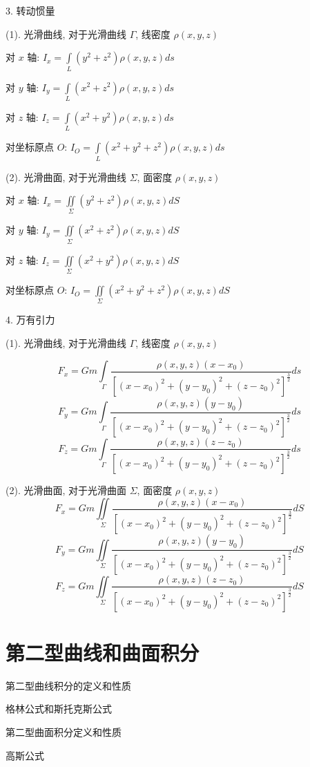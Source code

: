 3. \textcolor{purplea}{转动惯量}
\begin{definition}[转动惯量: $I=mr^2$]
	
	(1). 光滑曲线, 对于光滑曲线 $\Gamma$, 线密度 $\rho(x,y,z)$
	
	对 $x$ 轴: $I_{x}=\int\limits_{L}(y^2+z^2)\rho(x,y,z)ds$
	
	对 $y$ 轴: $I_{y}=\int\limits_{L}(x^2+z^2)\rho(x,y,z)ds$
	
	对 $z$ 轴: $I_{z}=\int\limits_{L}(x^2+y^2)\rho(x,y,z)ds$
	
	对坐标原点 $O$: $I_{O}=\int\limits_{L}(x^2+y^2+z^2)\rho(x,y,z)ds$
	
	(2). 光滑曲面, 对于光滑曲线 $\Sigma$, 面密度 $\rho(x,y,z)$
	
	对 $x$ 轴: $I_{x}=\iint\limits_{\Sigma}(y^2+z^2)\rho(x,y,z)dS$
	
	对 $y$ 轴: $I_{y}=\iint\limits_{\Sigma}(x^2+z^2)\rho(x,y,z)dS$
	
	对 $z$ 轴: $I_{z}=\iint\limits_{\Sigma}(x^2+y^2)\rho(x,y,z)dS$
	
	对坐标原点 $O$: $I_{O}=\iint\limits_{\Sigma}(x^2+y^2+z^2)\rho(x,y,z)dS$
	
\end{definition}

4. \textcolor{purpleb}{万有引力}
\begin{definition}[引力公式: $F=\dfrac{GMm}{r^2}$]	

	(1). 光滑曲线, 对于光滑曲线 $\Gamma$, 线密度 $\rho(x,y,z)$

	$$F_{x}=Gm\int\limits_{\Gamma}\dfrac{\rho(x,y,z)(x-x_{0})}{[(x-x_{0})^2+(y-y_{0})^2+(z-z_{0})^2]^{\frac{3}{2}}}ds$$
	$$F_{y}=Gm\int\limits_{\Gamma}\dfrac{\rho(x,y,z)(y-y_{0})}{[(x-x_{0})^2+(y-y_{0})^2+(z-z_{0})^2]^{\frac{3}{2}}}ds$$
	$$F_{z}=Gm\int\limits_{\Gamma}\dfrac{\rho(x,y,z)(z-z_{0})}{[(x-x_{0})^2+(y-y_{0})^2+(z-z_{0})^2]^{\frac{3}{2}}}ds$$
	
	(2). 光滑曲面, 对于光滑曲面 $\Sigma$, 面密度 $\rho(x,y,z)$
	$$F_{x}=Gm\iint\limits_{\Sigma}\dfrac{\rho(x,y,z)(x-x_{0})}{[(x-x_{0})^2+(y-y_{0})^2+(z-z_{0})^2]^{\frac{3}{2}}}dS$$
	$$F_{y}=Gm\iint\limits_{\Sigma}\dfrac{\rho(x,y,z)(y-y_{0})}{[(x-x_{0})^2+(y-y_{0})^2+(z-z_{0})^2]^{\frac{3}{2}}}dS$$
	$$F_{z}=Gm\iint\limits_{\Sigma}\dfrac{\rho(x,y,z)(z-z_{0})}{[(x-x_{0})^2+(y-y_{0})^2+(z-z_{0})^2]^{\frac{3}{2}}}dS$$
\end{definition}


\chapter{第二型曲线和曲面积分}
\begin{introduction}
	\item 第二型曲线积分的定义和性质
	\item 格林公式和斯托克斯公式
	\item 第二型曲面积分定义和性质
	\item 高斯公式
\end{introduction}
